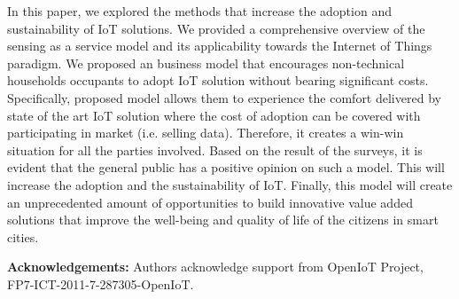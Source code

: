 \documentclass[conference]{IEEEtran}
\begin{document}
In this paper, we explored the methods that increase the adoption and sustainability of IoT solutions. We provided a comprehensive overview of the sensing as a service model and its applicability towards the Internet of Things paradigm. We proposed an business model that encourages non-technical households occupants to adopt IoT solution without bearing significant costs. Specifically, proposed model allows them to experience the comfort delivered by state of the art IoT solution where the cost of adoption can be covered with participating in market (i.e. selling data). Therefore, it creates a win-win situation for all the parties involved. Based on the result of the surveys, it is evident that the general public has a positive opinion on such a model. This will increase the adoption and the sustainability of IoT. Finally, this model will create an unprecedented amount of opportunities to build innovative value added solutions that improve the well-being and quality of life of the citizens in smart cities.














\textbf{Acknowledgements:} Authors acknowledge support from OpenIoT Project, FP7-ICT-2011-7-287305-OpenIoT. 



































  
\end{document}
